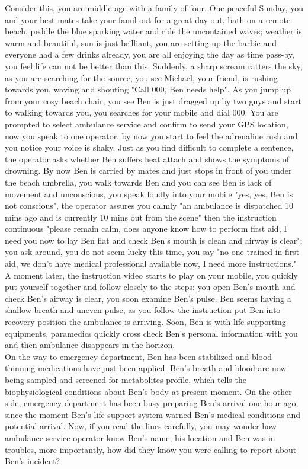 Consider this, you are middle age with a family of four. One peaceful Sunday, you and your best mates take your famil out for a great day out, bath on a remote beach, peddle the blue sparking water and ride the uncontained waves; weather is warm and beautiful, sun is just brilliant, you are setting up the barbie and everyone had a few drinks already, you are all enjoying the day as time pass-by, you feel life can not be better than this. Suddenly, a sharp scream ratters the sky, as you are searching for the source, you see Michael, your friend, is rushing towards you, waving and shouting "Call 000, Ben needs help". As you jump up from your cosy beach chair, you see Ben is just dragged up by two guys and start to walking towards you, you searches for your mobile and dial 000. You are prompted to select ambulance service and confirm to send your GPS location, now you speak to one operator, by now you start to feel the adrenaline rush and you notice your voice is shaky. Just as you find difficult to complete a sentence, the operator asks whether Ben suffers heat attach and shows the symptoms of drowning. By now Ben is carried by mates and just stops in front of you under the beach umbrella, you walk towards Ben and you can see Ben is lack of movement and unconscious, you speak loudly into your mobile "yes, yes, Ben is not conscious", the operator assures you calmly "an ambulance is dispatched 10 mins ago and is currently 10 mins out from the scene" then the instruction continuous "please remain calm, does anyone know how to perform first aid, I need you now to lay Ben flat and check Ben's mouth is clean and airway is clear"; you ask around, you do not seem lucky this time, you say "no one trained in first aid, we don't have medical professional available now, I need more instructions." \\
A moment later, the instruction video starts to play on your mobile, you quickly put yourself together and follow closely to the steps: you open Ben's mouth and check Ben's airway is clear, you soon examine Ben's pulse. Ben seems having a shallow breath and uneven pulse, as you follow the instruction put Ben into recovery position the ambulance is arriving. Soon, Ben is with life supporting equipments, paramedics quickly cross check Ben's personal information with you and then ambulance disappears in the horizon. \\
On the way to emergency department, Ben has been stabilized and blood thinning medications have just been applied. Ben's breath and blood are now being sampled and screened for metabolites profile, which tells the biophysiological conditions about Ben's body at present moment. On the other side, emergency department has been busy preparing Ben's arrival one hour ago, since the moment Ben's life support system warned Ben's medical conditions and potential arrival. Now, if you read the lines carefully, you may wonder how ambulance service operator knew Ben's name, his location and Ben was in troubles, more importantly, how did they know you were calling to report about Ben's incident?  \\
